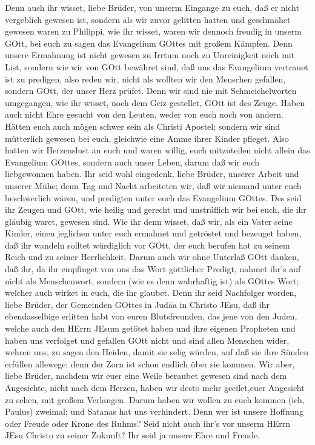  Denn auch ihr wisset, liebe Brüder, von unserm Eingange zu
euch, daß er nicht vergeblich gewesen ist,  sondern als wir
zuvor gelitten hatten und geschmähet gewesen waren zu Philippi, wie ihr
wisset, waren wir dennoch freudig in unserm GOtt, bei euch zu sagen das
Evangelium GOttes mit großem Kämpfen.  Denn unsere Ermahnung
ist nicht gewesen zu Irrtum noch zu Unreinigkeit noch mit List,
 sondern wie wir von GOtt bewähret sind, daß uns das
Evangelium vertrauet ist zu predigen, also reden wir, nicht als wollten
wir den Menschen gefallen, sondern GOtt, der unser Herz prüfet.
 Denn wir sind nie mit Schmeichelworten umgegangen, wie ihr
wisset, noch dem Geiz gestellet, GOtt ist des Zeuge.  Haben
auch nicht Ehre gesucht von den Leuten, weder von euch noch von andern.
 Hätten euch auch mögen schwer sein als Christi Apostel;
sondern wir sind mütterlich gewesen bei euch, gleichwie eine Amme ihrer
Kinder pfleget.  Also hatten wir Herzenslust an euch und
waren willig, euch mitzuteilen nicht allein das Evangelium GOttes,
sondern auch unser Leben, darum daß wir euch liebgewonnen haben.
 Ihr seid wohl eingedenk, liebe Brüder, unserer Arbeit und
unserer Mühe; denn Tag und Nacht arbeiteten wir, daß wir niemand unter
euch beschwerlich wären, und predigten unter euch das Evangelium GOttes.
 Des seid ihr Zeugen und GOtt, wie heilig und gerecht und
unsträflich wir bei euch, die ihr gläubig waret, gewesen sind.
 Wie ihr denn wisset, daß wir, als ein Vater seine Kinder,
einen jeglichen unter euch ermahnet und getröstet  und
bezeuget haben, daß ihr wandeln solltet würdiglich vor GOtt, der euch
berufen hat zu seinem Reich und zu seiner Herrlichkeit. 
Darum auch wir ohne Unterlaß GOtt danken, daß ihr, da ihr empfinget von
uns das Wort göttlicher Predigt, nahmet ihr's auf nicht als
Menschenwort, sondern (wie es denn wahrhaftig ist) als GOttes Wort;
welcher auch wirket in euch, die ihr glaubet.  Denn ihr
seid Nachfolger worden, liebe Brüder, der Gemeinden GOttes in Judäa in
Christo JEsu, daß ihr ebendasselbige erlitten habt von euren
Blutsfreunden, das jene von den Juden,  welche auch den
HErrn JEsum getötet haben und ihre eigenen Propheten und haben uns
verfolget und gefallen GOtt nicht und sind allen Menschen wider,
 wehren uns, zu sagen den Heiden, damit sie selig würden,
auf daß sie ihre Sünden erfüllen allewege; denn der Zorn ist schon
endlich über sie kommen.  Wir aber, liebe Brüder, nachdem
wir euer eine Weile beraubet gewesen sind nach dem Angesichte, nicht
nach dem Herzen, haben wir desto mehr geeilet,euer Angesicht zu sehen,
mit großem Verlangen.  Darum haben wir wollen zu euch
kommen (ich, Paulus) zweimal; und Satanas hat uns verhindert.
 Denn wer ist unsere Hoffnung oder Freude oder Krone des
Ruhms? Seid nicht auch ihr's vor unserm HErrn JEsu Christo zu seiner
Zukunft?  Ihr seid ja unsere Ehre und Freude.

